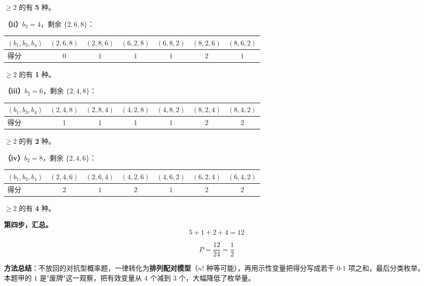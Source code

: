 \begin{answer}
$\ge2$ 的有 \textbf{5} 种。

\textbf{（ii）$b_2=4$}，剩余 $\{2,6,8\}$：

\begin{center}
\begin{tabular}{lcccccc}
\toprule
$\left(b_1,b_3,b_4\right)$ & $(2,6,8)$ & $(2,8,6)$ & $(6,2,8)$ & $(6,8,2)$ & $(8,2,6)$ & $(8,6,2)$ \\
\midrule
得分 & $0$ & $1$ & $1$ & $1$ & $2$ & $1$ \\
\bottomrule
\end{tabular}
\end{center}

$\ge2$ 的有 \textbf{1} 种。

\textbf{（iii）$b_2=6$}，剩余 $\{2,4,8\}$：

\begin{center}
\begin{tabular}{lcccccc}
\toprule
$\left(b_1,b_3,b_4\right)$ & $(2,4,8)$ & $(2,8,4)$ & $(4,2,8)$ & $(4,8,2)$ & $(8,2,4)$ & $(8,4,2)$ \\
\midrule
得分 & $1$ & $1$ & $1$ & $1$ & $2$ & $2$ \\
\bottomrule
\end{tabular}
\end{center}

$\ge2$ 的有 \textbf{2} 种。

\textbf{（iv）$b_2=8$}，剩余 $\{2,4,6\}$：

\begin{center}
\begin{tabular}{lcccccc}
\toprule
$\left(b_1,b_3,b_4\right)$ & $(2,4,6)$ & $(2,6,4)$ & $(4,2,6)$ & $(4,6,2)$ & $(6,2,4)$ & $(6,4,2)$ \\
\midrule
得分 & $2$ & $1$ & $2$ & $1$ & $2$ & $2$ \\
\bottomrule
\end{tabular}
\end{center}

$\ge2$ 的有 \textbf{4} 种。

\textbf{第四步，汇总。}
\nopagebreak[4]
\[5+1+2+4=12\]

\nopagebreak[4]
\[P=\frac{12}{24}=\frac12\]

\begin{gktip}
\textbf{方法总结}：不放回的对抗型概率题，一律转化为\textbf{排列配对模型}（$n!$ 种等可能），再用示性变量把得分写成若干 $0$-$1$ 项之和，最后分类枚举。本题甲的 $1$ 是"废牌"这一观察，把有效变量从 4 个减到 3 个，大幅降低了枚举量。
\end{gktip}


\par\medskip

\end{answer}

